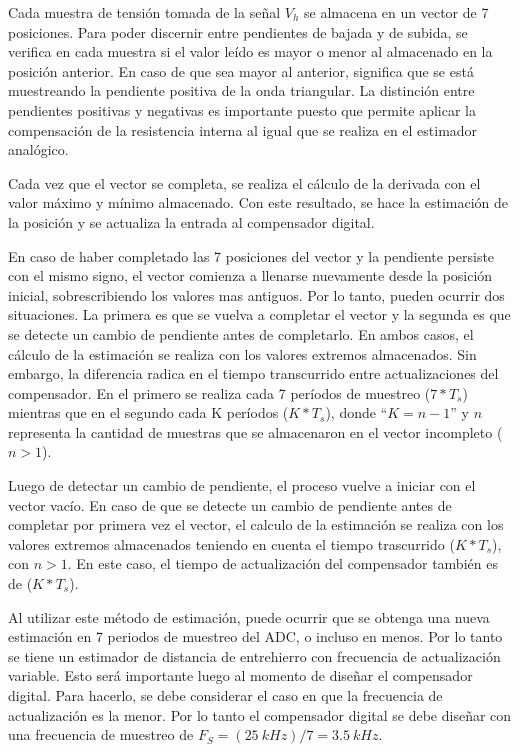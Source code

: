 Cada muestra de tensión tomada de la señal $V_h$ se almacena en un vector de 7 posiciones. Para poder discernir entre pendientes de bajada y de subida, se verifica en cada muestra si el valor leído es mayor o menor al almacenado en la posición anterior. En caso de que sea mayor al anterior, significa que se está muestreando la pendiente positiva de la onda triangular. La distinción entre pendientes positivas y negativas es importante puesto que permite aplicar la compensación de la resistencia interna al igual que se realiza en el estimador analógico. 

Cada vez que el vector se completa, se realiza el cálculo de la derivada con el valor máximo y mínimo almacenado. Con este resultado, se hace la estimación de la posición y se actualiza la entrada al compensador digital.

En caso de haber completado las 7 posiciones del vector y la pendiente persiste con el mismo signo, el vector comienza a llenarse nuevamente desde la posición inicial, sobrescribiendo los valores mas antiguos. Por lo tanto, pueden ocurrir dos situaciones. La primera es que se vuelva a completar el vector y la segunda es que se detecte un cambio de pendiente antes de completarlo. En ambos casos, el cálculo de la estimación se realiza con los valores extremos almacenados. Sin embargo, la diferencia radica en el tiempo transcurrido entre actualizaciones del compensador. En el primero se realiza cada 7 períodos de muestreo ($7*T_s$) mientras que en el segundo cada K períodos ($K*T_s$), donde “$K=n-1$” y $n$ representa la cantidad de muestras que se almacenaron en el vector incompleto ($n>1$).

Luego de detectar un cambio de pendiente, el proceso vuelve a iniciar con el vector vacío. En caso de que se detecte un cambio de pendiente antes de completar por primera vez el vector, el calculo de la estimación se realiza con los valores extremos almacenados teniendo en cuenta el tiempo trascurrido ($K*T_s$), con $n>1$. En este caso, el tiempo de actualización del compensador también es de ($K*T_s$).

Al utilizar este método de estimación, puede ocurrir que se obtenga una nueva estimación en 7 periodos de muestreo del ADC, o incluso en menos. Por lo tanto se tiene un estimador de distancia de entrehierro con frecuencia de actualización variable. Esto será importante luego al momento de diseñar el compensador digital. Para hacerlo, se debe considerar el caso en que la frecuencia de actualización es la menor. Por lo tanto el compensador digital se debe diseñar con una frecuencia de muestreo de $F_S=(25\:kHz)/7 = 3.5\:kHz$.






